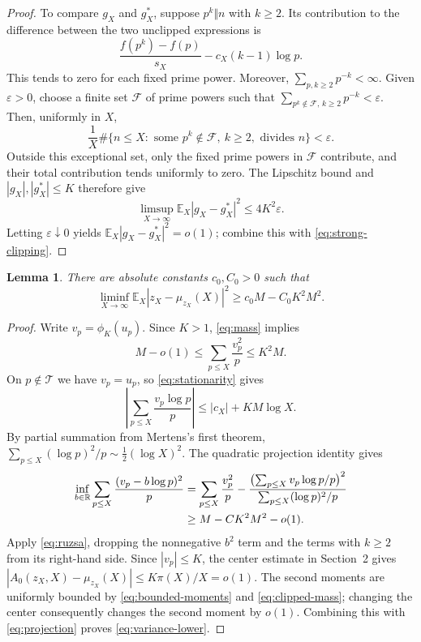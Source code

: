 \documentclass[11pt]{article}
\numberwithin{equation}{section}
\newtheorem{lemma}[theorem]{Lemma}
\newcommand{\R}{\mathbb R}
\newcommand{\E}{\mathbb E}
\newcommand{\clip}{\phi_K}
\begin{document}
\begin{proof}
To compare $g_X$ and $g_X^*$, suppose $p^k\Vert n$ with $k\ge2$. Its
contribution to the difference between the two unclipped expressions is
\[
 \frac{f(p^k)-f(p)}{s_X}-c_X(k-1)\log p.
\]
This tends to zero for each fixed prime power. Moreover,
$\sum_{p,k\ge2}p^{-k}<\infty$. Given $\varepsilon>0$, choose a finite set $\mathcal F$ of prime
powers such that $\sum_{p^k\notin\mathcal F,\,k\ge2}p^{-k}<\varepsilon$.
Then, uniformly in $X$,
\[
 \frac1X\#\{n\le X:\text{ some }p^k\notin\mathcal F,\ k\ge2,
                    \text{ divides }n\}<\varepsilon.
\]
Outside this exceptional set, only the fixed prime powers in
$\mathcal F$ contribute, and their total contribution tends uniformly
to zero. The Lipschitz bound and $|g_X|,|g_X^*|\le K$ therefore give
\[
 \limsup_{X\to\infty}\E_X|g_X-g_X^*|^2\le4K^2\varepsilon.
\]
Letting $\varepsilon\downarrow0$ yields $\E_X|g_X-g_X^*|^2=o(1)$;
combine this with \eqref{eq:strong-clipping}.
\end{proof}

\begin{lemma}\label{lem:variance-lower}
There are absolute constants $c_0,C_0>0$ such that
\begin{equation}\label{eq:variance-lower}
 \liminf_{X\to\infty}\E_X|z_X-\mu_{z_X}(X)|^2
 \ge c_0M-C_0K^2M^2.
\end{equation}
\end{lemma}

\begin{proof}
Write $v_p=\clip(u_p)$. Since $K>1$, \eqref{eq:mass} implies
\begin{equation}\label{eq:clipped-mass}
 M-o(1)\le\sum_{p\le X}\frac{v_p^2}{p}\le K^2M.
\end{equation}
On $p\notin\mathcal T$ we have $v_p=u_p$, so
\eqref{eq:stationarity} gives
\begin{equation}\label{eq:projection-numerator}
 \left|\sum_{p\le X}\frac{v_p\log p}{p}\right|
 \le |c_X|+KM\log X.
\end{equation}
By partial summation from Mertens's first theorem,
$\sum_{p\le X}(\log p)^2/p\sim\tfrac12(\log X)^2$.
The quadratic projection identity gives
\begin{align}
 \inf_{b\in\R}\sum_{p\le X}\frac{(v_p-b\log p)^2}{p}
 &=\sum_{p\le X}\frac{v_p^2}{p}
   -\frac{\bigl(\sum_{p\le X}v_p\log p/p\bigr)^2}
          {\sum_{p\le X}(\log p)^2/p}\notag\\
 &\ge M-C K^2M^2-o(1).\label{eq:projection}
\end{align}
Apply \eqref{eq:ruzsa}, dropping the nonnegative $b^2$ term and the
terms with $k\ge2$ from its right-hand side.
Since $|v_p|\le K$, the center estimate in Section~2 gives
$|A_0(z_X,X)-\mu_{z_X}(X)|\le K\pi(X)/X=o(1)$.
The second moments are uniformly bounded by
\eqref{eq:bounded-moments} and \eqref{eq:clipped-mass}; changing the
center consequently changes the second moment by $o(1)$.
Combining this with \eqref{eq:projection} proves
\eqref{eq:variance-lower}.
\end{proof}
\end{document}
